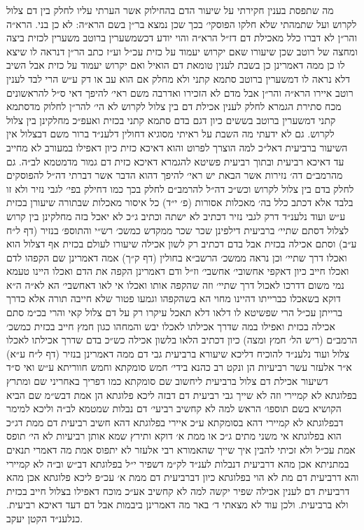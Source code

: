 \documentclass[12pt, openany]{book}
\begin{document}
\begin{multicols}{2}
מה שתפסת בענין חקירתי על שיעור הדם בהחילוק אשר הערתי עליו לחלק בין דם צלול לקרוש ועל שתמהתי שלא חלקו הפוסקי׳ בכך שכן נמצא בר״ן בשם הרא״ה: לא כן בני. הרא״ה והר״ן לא דברו כלל מאכילת דם דז״ל הרא״ה והוי יודע דכשמשערין ברוטב משערין לכזית ביצה ומחצה של רוטב שכן שיעורו שאם יקרוש יעמוד על כזית עכ״ל וע״ז כתב הר״ן דנראה לו שיצא לו כן ממה דאמרינן כן בשבת לענין טומאת דם הואיל ואם יקרוש יעמוד על כזית אבל השיב דלא נראה לו דמשערין ברוטב סתמא קתני ולא מחלק אם הוא עב או דק ע״ש הרי לבד לענין רוטב איירו הרא״ה והר״ן אבל מדם לא הזכירו ואדרבה משם ראי׳ להיפך דאי ס״ל להראשונים מכח סתירת הגמרא לחלק לענין אכילת דם בין צלול לקרוש לא הי׳ להר״ן לחלוק מדסתמא קתני דמשערין ברוטב בששים כיון דגם בדם סתמא קתני בכזית ואעפ״כ מחלקינן בין צלול לקרוש. גם לא ידעתי מה השבת על ראיתי מסוגיא דחולין דלענ״ד ברור משם דבצלול אין השיעור ברביעית דאל״כ למה הוצרך לפרוט והוא דאיכא כזית כיון דאפילו במעורב לא מחייב עד דאיכא רביעית ובתוך רביעית פשיטא להגמרא דאיכא כזית דם גמור מדמטמא לב״ה. גם מהרמב״ם דה׳ נזירות אשר הבאת יש ראי׳ להיפך דהוא הדבר אשר דברתי דה״ל להפוסקים לחלק בדם בין צלול לקרוש וכש״כ דה״ל להרמב״ם לחלק בכך כמו דחילק בפי׳ לגבי נזיר ולא זו בלבד אלא דכתב כלל בה׳ מאכלות אסורות (פ׳ י״ד) כל איסור מאכלות שבתורה שיעורן בכזית ע״ש ועוד נלענ״ד דרק לגבי נזיר דכתיב לא ישתה וכתיב ג״כ לא יאכל בזה מחלקינן בין קרוש לצלול דסתם שתיי׳ ברביעית דילפינן שכר שכר ממקדש כמשכ׳ רש״י והתוספ׳ בנזיר (דף ל״ח ע״ב) וסתם אכילה בכזית אבל בדם דכתיב רק לשון אכילה שיעורו לעולם בכזית אף דצלול הוא ואכלו דרך שתיי׳ וכן נראה ממשכ׳ הרשב״א בחולין (דף ק״ך) אמה דאמרינן שם הקפהו לדם ואכלו חייב כיון דאקפי אחשובי׳ אחשבי׳ וז״ל ודם דאמרינן הקפה את הדם ואכלו היינו טעמא נמי משום דדרכו לאכול דרך שתיי׳ וזה שהקפה אותו ואכלו אי לאו דאחשבי׳ הא לא״ה ה״א דוקא בשאכלו כברייתו דהיינו מחוי הא בשהקפהו וגמעו פטור שלא חייבה תורה אלא כדרך ברייתן עכ״ל הרי שפשיטא לו דלאו דלא תאכל עיקרו רק על דם צלול קאי והרי בכ״מ סתם אכילה בכזית ואפילו במה שדרך אכילתו לאכלו יבש והמחהו כגון חמץ חייב בכזית כמשכ׳ הרמב״ם (ריש הל׳ חמץ ומצה) כיון דכתיב הלאו בלשון אכילה כש״כ בדם שדרך אכילתו לאכלו צלול ועוד נלענ״ד להוכיח דליכא שיעורא ברביעית גבי דם ממה דאמרינן בנזיר (דף ל״ח ע״א) א״ר אלעזר עשר רביעיות הן ונקט רב כהנא בידי׳ חמש סומקתא וחמש חווריתא ע״ש ואי ס״ד דשיעור אכילת דם צלול ברביעית ליחשוב שם סומקתא כמו דפריך באחריני שם ומתרץ בפלוגתא לא קמיירי וזה לא שייך גבי רביעית דם דבזה ליכא פלוגתא הן אמת דבש״מ שם הביא הקושיא בשם תוספו׳ הראש למה לא קחשיב רביעי׳ דם נבלות שמטמא לב״ה וליכא למימר דבפלוגתא לא קמיירי דהא בסומקתא ע״כ איירי בפלוגתא דהא חשיב רביעית דם ממת דג״כ הוא בפלוגתא אי משני מתים ג״כ או ממת א׳ דוקא ותירץ שמא אותן רביעיות לא הי׳ תופס אמת עכ״ל ולא זכיתי להבין איך שייך שהאמורא רבי אלעזר לא יתפוס אמת מה דאמרי תנאים במתניתא אכן מהא דרביעית דנבלות לענ״ד לק״מ דשפיר י״ל בפלוגתא דב״ש וב״ה לא קמיירי והא דרביעית דם מת לא הוי בפלוגתא כיון דברביעית דם ממת א׳ עכ״פ ליכא פלוגתא אכן מהא דרביעית דם לענין אכילה שפיר יקשה למה לא קחשיב אע״כ מוכח דאפילו בצלול חייב בכזית ולא ברביעית. ולכן עוד לא מצאתי ד׳ באר מה דאמרינן ביבמות אבל דם דעד דאיכא רביעית. כנלענ״ד הקטן יעקב.\\\vspace{0pt}

\end{multicols}\newpage
\end{document}
